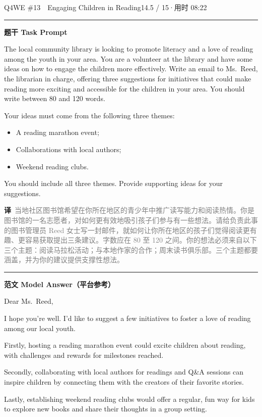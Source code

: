 \documentclass[11pt]{article}
\newcommand{\ptesub}[1]{%
  \par\needspace{2\baselineskip}\smallskip
  {\color{cAccent}\rule[-0.2ex]{3pt}{1.05em}}\hspace{6pt}%
  {\bfseries\color{cHead}#1}\par\nopagebreak\smallskip}
\newcommand{\zh}[1]{{\footnotesize\textcolor{cNote}{\textbf{译}}\ \textcolor{gray}{#1}}}
\begin{document}
\begin{qblock}{Q4\quad WE \#13\ \ Engaging Children in Reading}{14.5 / 15\quad·\quad 用时 08:22}

\ptesub{题干 Task Prompt}
\begin{promptbox}
The local community library is looking to promote literacy and a love of reading among the youth in your area. You are a volunteer at the library and have some ideas on how to engage the children more effectively. Write an email to Ms.\ Reed, the librarian in charge, offering three suggestions for initiatives that could make reading more exciting and accessible for the children in your area. You should write between 80 and 120 words.

\smallskip Your ideas must come from the following three themes:
\begin{itemize}[leftmargin=1.4em,topsep=2pt,itemsep=0pt]
  \item A reading marathon event;
  \item Collaborations with local authors;
  \item Weekend reading clubs.
\end{itemize}
You should include all three themes. Provide supporting ideas for your suggestions.
\end{promptbox}
\zh{当地社区图书馆希望在你所在地区的青少年中推广读写能力和阅读热情。你是图书馆的一名志愿者，对如何更有效地吸引孩子们参与有一些想法。请给负责此事的图书管理员 Reed 女士写一封邮件，就如何让你所在地区的孩子们觉得阅读更有趣、更容易获取提出三条建议。字数应在 80 至 120 之间。你的想法必须来自以下三个主题：阅读马拉松活动；与本地作家的合作；周末读书俱乐部。三个主题都要涵盖，并为你的建议提供支撑性想法。}

\ptesub{范文 Model Answer（平台参考）}
\begin{modelbox}
Dear Ms.\ Reed,

I hope you're well. I'd like to suggest a few initiatives to foster a love of reading among our local youth.

Firstly, hosting a reading marathon event could excite children about reading, with challenges and rewards for milestones reached.

Secondly, collaborating with local authors for readings and Q\&A sessions can inspire children by connecting them with the creators of their favorite stories.

Lastly, establishing weekend reading clubs would offer a regular, fun way for kids to explore new books and share their thoughts in a group setting.


\end{modelbox}
\end{qblock}
\end{document}
